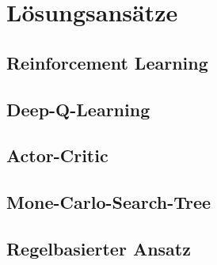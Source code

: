 \section{Lösungsansätze}

\subsection{Reinforcement Learning}
\subsection{Deep-Q-Learning}
\subsection{Actor-Critic}
\subsection{Mone-Carlo-Search-Tree}
\subsection{Regelbasierter Ansatz}